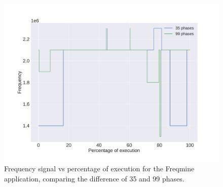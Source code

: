 \begin{figure}[h]
	\centering
	\includegraphics[width=\columnwidth]{phases/figures/signals/completo_freq_freq_signals_cmp.pdf}
	\caption{Frequency signal vs percentage of execution for the Freqmine application, comparing the difference of 35 and 99 phases.}
\end{figure}%

